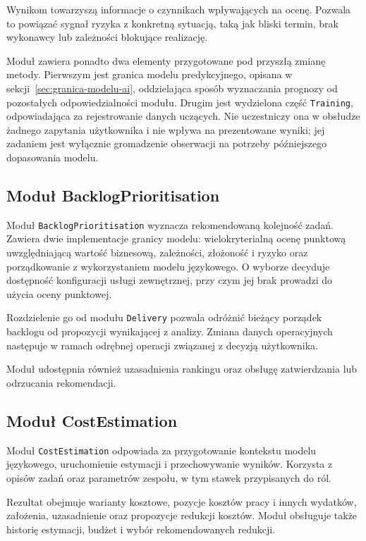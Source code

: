 Wynikom towarzyszą informacje o czynnikach wpływających na ocenę. Pozwala to powiązać sygnał ryzyka z konkretną sytuacją, taką jak bliski termin, brak wykonawcy lub zależności blokujące realizację.

Moduł zawiera ponadto dwa elementy przygotowane pod przyszłą zmianę metody. Pierwszym jest granica modelu predykcyjnego, opisana w sekcji~\ref{sec:granica-modelu-ai}, oddzielająca sposób wyznaczania prognozy od pozostałych odpowiedzialności modułu. Drugim jest wydzielona część \texttt{Training}, odpowiadająca za rejestrowanie danych uczących. Nie uczestniczy ona w obsłudze żadnego zapytania użytkownika i nie wpływa na prezentowane wyniki; jej zadaniem jest wyłącznie gromadzenie obserwacji na potrzeby późniejszego dopasowania modelu.

\subsection{Moduł BacklogPrioritisation}

Moduł \texttt{BacklogPrioritisation} wyznacza rekomendowaną kolejność zadań. Zawiera dwie implementacje granicy modelu: wielokryterialną ocenę punktową uwzględniającą wartość biznesową, zależności, złożoność i ryzyko oraz porządkowanie z wykorzystaniem modelu językowego. O wyborze decyduje dostępność konfiguracji usługi zewnętrznej, przy czym jej brak prowadzi do użycia oceny punktowej.

Rozdzielenie go od modułu \texttt{Delivery} pozwala odróżnić bieżący porządek backlogu od propozycji wynikającej z analizy. Zmiana danych operacyjnych następuje w ramach odrębnej operacji związanej z decyzją użytkownika.

Moduł udostępnia również uzasadnienia rankingu oraz obsługę zatwierdzania lub odrzucania rekomendacji.

\subsection{Moduł CostEstimation}

Moduł \texttt{CostEstimation} odpowiada za przygotowanie kontekstu modelu językowego, uruchomienie estymacji i przechowywanie wyników. Korzysta z opisów zadań oraz parametrów zespołu, w tym stawek przypisanych do ról.

Rezultat obejmuje warianty kosztowe, pozycje kosztów pracy i innych wydatków, założenia, uzasadnienie oraz propozycje redukcji kosztów. Moduł obsługuje także historię estymacji, budżet i wybór rekomendowanych redukcji.

